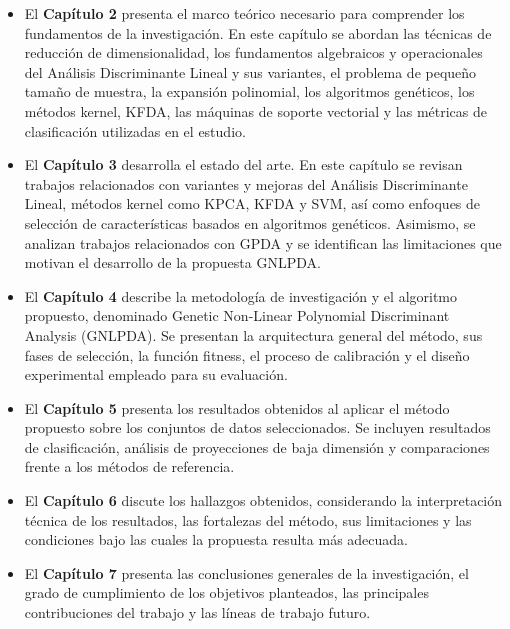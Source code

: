\begin{itemize}

	\item El \textbf{Capítulo 2} presenta el marco teórico necesario para comprender los fundamentos de la investigación. En este capítulo se abordan las técnicas de reducción de dimensionalidad, los fundamentos algebraicos y operacionales del Análisis Discriminante Lineal y sus variantes, el problema de pequeño tamaño de muestra, la expansión polinomial, los algoritmos genéticos, los métodos kernel, KFDA, las máquinas de soporte vectorial y las métricas de clasificación utilizadas en el estudio.
	
	\item El \textbf{Capítulo 3} desarrolla el estado del arte. En este capítulo se revisan trabajos relacionados con variantes y mejoras del Análisis Discriminante Lineal, métodos kernel como KPCA, KFDA y SVM, así como enfoques de selección de características basados en algoritmos genéticos. Asimismo, se analizan trabajos relacionados con GPDA y se identifican las limitaciones que motivan el desarrollo de la propuesta GNLPDA.
	
	\item El \textbf{Capítulo 4} describe la metodología de investigación y el algoritmo propuesto, denominado Genetic Non-Linear Polynomial Discriminant Analysis (GNLPDA). Se presentan la arquitectura general del método, sus fases de selección, la función fitness, el proceso de calibración y el diseño experimental empleado para su evaluación.
	
	\item El \textbf{Capítulo 5} presenta los resultados obtenidos al aplicar el método propuesto sobre los conjuntos de datos seleccionados. Se incluyen resultados de clasificación, análisis de proyecciones de baja dimensión y comparaciones frente a los métodos de referencia.
	
	\item El \textbf{Capítulo 6} discute los hallazgos obtenidos, considerando la interpretación técnica de los resultados, las fortalezas del método, sus limitaciones y las condiciones bajo las cuales la propuesta resulta más adecuada.
	
	\item El \textbf{Capítulo 7} presenta las conclusiones generales de la investigación, el grado de cumplimiento de los objetivos planteados, las principales contribuciones del trabajo y las líneas de trabajo futuro.
	
\end{itemize}

